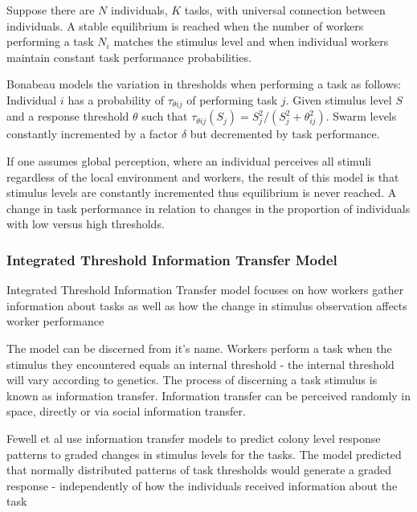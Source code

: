 Suppose there are $N$ individuals, $K$ tasks, with universal connection between individuals. 
A stable equilibrium is reached when the number of workers performing a task $N_i$ matches the stimulus level and when individual workers maintain constant task performance probabilities. \cite{page1990self}

Bonabeau models the variation in thresholds when performing a task as follows: Individual $i$ has a probability of $\tau_{\theta ij}$ of performing task $j$. Given stimulus level $S$ and a response threshold $\theta$ such that $\tau_{\theta ij}(S_j) = S_j^2/(S_j^2 + \theta_{ij}^2)$. Swarm levels constantly incremented by a factor $\delta$ but decremented by task performance.

If one assumes global perception, where an individual perceives all stimuli regardless of the local environment and workers, the result of this model is that stimulus levels are constantly incremented thus equilibrium is never reached. A change in task performance in relation to changes in the proportion of individuals with low versus high thresholds. %





\subsubsection{Integrated Threshold Information Transfer Model}
Integrated Threshold Information Transfer model \cite{fewell1999division} focuses on how workers gather information about tasks as well as how the change in stimulus observation affects worker performance %

The model can be discerned from it's name. Workers perform a task when the stimulus they encountered equals an internal threshold - the internal threshold will vary according to genetics. The process of discerning a task stimulus is known as information transfer. Information transfer can be perceived randomly in space, directly or via social information transfer.

Fewell et al \cite{fewell1999division} use information transfer models to predict colony level response patterns to graded changes in stimulus levels for the tasks. The model predicted that normally distributed patterns of task thresholds would generate a graded response - independently of how the individuals received information about the task

